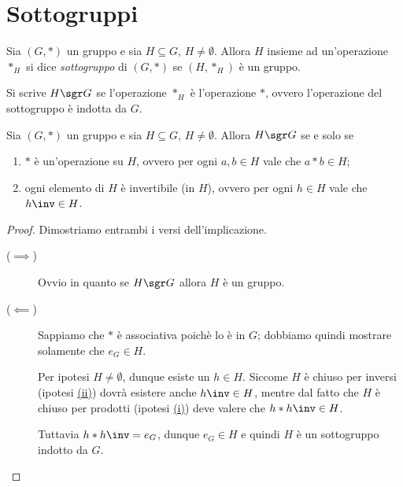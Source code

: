 \section{Sottogruppi}

\begin{definition}[Sottogruppo]\label{def:sottogruppo}
    Sia $(G, *)$ un gruppo e sia $H \subseteq G$, $H \neq \emptyset$.    
    Allora $H$ insieme ad un'operazione $*_H$ si dice \emph{sottogruppo} di $(G, *)$ se $(H, *_H)$ è un gruppo.

    Si scrive $H \sgr G$ se l'operazione $*_H$ è l'operazione $*$, ovvero l'operazione del sottogruppo è indotta da $G$.
\end{definition}

\begin{proposition}\label{prop:cond_sgr}
    Sia $(G, *)$ un gruppo e sia $H \subseteq G$, $H \neq \emptyset$.
    Allora $H \sgr G$ se e solo se \begin{enumerate}[label={(\roman*)}, ref={\theproposition: (\roman*)}]
        \item \label{prop:cond_sgr:op} $*$ è un'operazione su $H$, ovvero per ogni $a, b \in H$ vale che $a*b \in H$;
        \item \label{prop:cond_sgr:inv} ogni elemento di $H$ è invertibile (in $H$), ovvero per ogni $h \in H$ vale che $h\inv \in H$.
    \end{enumerate}
\end{proposition}
\begin{proof}
    Dimostriamo entrambi i versi dell'implicazione.
    \begin{description}
        \item[($\implies$)] Ovvio in quanto se $H \sgr G$ allora $H$ è un gruppo.
        \item[($\impliedby$)] Sappiamo che $*$ è associativa poichè lo è in $G$; dobbiamo quindi mostrare solamente che $e_G \in H$.
        
        Per ipotesi $H \neq \emptyset$, dunque esiste un $h \in H$. Siccome $H$ è chiuso per inversi (ipotesi \hyperref[prop:cond_sgr:inv]{(ii)}) dovrà esistere anche $h\inv \in H$, mentre dal fatto che $H$ è chiuso per prodotti (ipotesi \hyperref[prop:cond_sgr:op]{(i)}) deve valere che $h * h\inv \in H$. 

        Tuttavia $h * h\inv = e_G$, dunque $e_G \in H$ e quindi $H$ è un sottogruppo indotto da $G$. \qedhere
    \end{description}
\end{proof}


